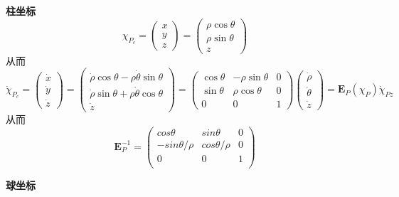 \documentclass[11pt]{ctexart}
\begin{document}
\noindent\textbf{柱坐标}
\begin{equation}
\left.\chi_{P_c}=\left(\begin{array}{c}x\\y\\z\end{array}\right.\right)=\left(\begin{array}{c}\rho\cos\theta\\\rho\sin\theta\\z\end{array}\right)
\end{equation}
从而
\begin{equation}
\dot{\chi}_{P_c}=\left(\begin{array}{c}\dot{x}\\\dot{y}\\\dot{z}\end{array}\right)=\left(\begin{array}{c}\dot{\rho}\cos\theta-\rho\dot{\theta}\sin\theta\\\dot{\rho}\sin\theta+\rho\dot{\theta}\cos\theta\\\dot{z}\end{array}\right)
=\begin{pmatrix}
    \cos\theta & -\rho\sin\theta & 0 \\
    \sin\theta & \rho\cos\theta & 0 \\
    0 & 0 & 1
    \end{pmatrix}\left(\begin{array}{c}\dot{\rho}\\\dot{\theta}\\\dot{z}\end{array}\right)=\mathbf{E}_{P}\left(\chi_{P}\right)
    \dot{\chi}_{Pz}
\end{equation}
从而
\begin{equation}
\mathbf{E}_{P}^{-1}=
\begin{pmatrix}
    cos\theta & sin\theta & 0 \\
    -sin\theta/\rho & cos\theta/\rho & 0 \\
    0 & 0 & 1 \\
\end{pmatrix}
\end{equation}

\noindent\textbf{球坐标}
\end{document}
